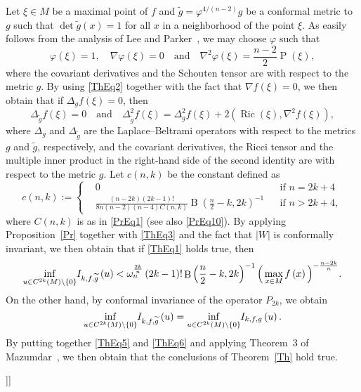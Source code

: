 \documentclass[reqno]{amsart}
\numberwithin{equation}{section}
\DeclareMathOperator{\Ricci}{Ric}
\DeclareMathOperator{\Schouten}{P}
\DeclareMathOperator{\Beta}{B}
\newcommand{\<}{\left<}
\renewcommand{\>}{\right>}
\renewcommand{\[}{\left[}
\renewcommand{\]}{\right]}
\renewcommand{\(}{\left(}
\renewcommand{\)}{\right)}
\begin{document}
\[\[\proof[Proof of Theorem~\ref{Th}]
Let $\xi\in M$ be a maximal point of $f$ and $\widetilde{g}=\varphi^{4/\(n-2\)}g$ be a conformal metric to $g$ such that $\det\widetilde{g}\(x\)=1$ for all $x$ in a neighborhood of the point $\xi$. As easily follows from the analysis of Lee and Parker~\cite{LeePar}, we may choose $\varphi$ such that
\begin{equation}\label{ThEq2}
\varphi\(\xi\)=1,\quad\nabla\varphi\(\xi\)=0\quad\text{and}\quad\nabla^2\varphi\(\xi\)=\frac{n-2}{2}\Schouten\(\xi\),
\end{equation}
where the covariant derivatives and the Schouten tensor are with respect to the metric $g$. By using \eqref{ThEq2} together with the fact that $\nabla f\(\xi\)=0$, we then obtain that if $\Delta_gf\(\xi\)=0$, then
\begin{equation}\label{ThEq3}
\Delta_{\widetilde{g}}f\(\xi\)=0\quad\text{and}\quad\Delta_{\widetilde{g}}^2f\(\xi\)=\Delta_g^2f\(\xi\)+2\(\Ricci\(\xi\),\nabla^2f\(\xi\)\),
\end{equation}
where $\Delta_g$ and $\Delta_{\widetilde{g}}$ are the Laplace--Beltrami operators with respect to the metrics $g$ and $\widetilde{g}$, respectively, and the covariant derivatives, the Ricci tensor and the multiple inner product in the right-hand side of the second identity are with respect to the metric $g$. Let $c\(n,k\)$ be the constant defined as 
\begin{equation}\label{ThEq4}
c\(n,k\):=\left\{\begin{aligned}&0&&\text{if }n=2k+4\\&\frac{\(n-2k\)\(2k-1\)!}{8n\(n-2\)\(n-4\)C\(n,k\)}\Beta\(\frac{n}{2}-k,2k\)^{-1}&&\text{if }n>2k+4,\end{aligned}\right.
\end{equation}
where $C\(n,k\)$ is as in \eqref{PrEq1} (see also \eqref{PrEq10}). By applying Proposition~\ref{Pr} together with \eqref{ThEq3} and the fact that $\left|W\right|$ is conformally invariant, we then obtain that if \eqref{ThEq1} holds true, then
\begin{equation}\label{ThEq5}
\inf_{u\in C^{2k}\(M\)\backslash\left\{0\right\}}\hspace{-2pt}I_{k,f,\widetilde{g}}\(u\)<\omega_n^{\frac{2k}{n}}\(2k-1\)!\Beta\(\frac{n}{2}-k,2k\)^{-1}\Big(\max_{x\in M} f\(x\)\Big)^{-\frac{n-2k}{n}}.
\end{equation}
On the other hand, by conformal invariance of the operator $P_{2k}$, we obtain
\begin{equation}\label{ThEq6}
\inf_{u\in C^{2k}\(M\)\backslash\left\{0\right\}}\hspace{-2pt}I_{k,f,\widetilde{g}}\(u\)=\inf_{u\in C^{2k}\(M\)\backslash\left\{0\right\}}\hspace{-2pt}I_{k,f,g}\(u\).
\end{equation}
By putting together \eqref{ThEq5} and \eqref{ThEq6} and applying Theorem~3 of Mazumdar~\cite{Maz}, we then obtain that the conclusions of Theorem~\ref{Th} hold true. 
\endproof

\]\]
\end{document}
